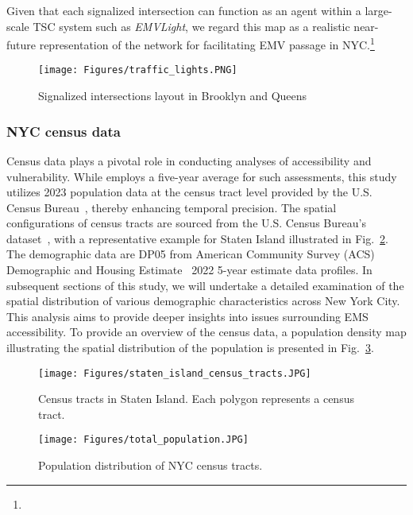 Given that each signalized intersection can function as an agent within a large-scale TSC system such as \textit{EMVLight}, we regard this map as a realistic near-future representation of the network for facilitating EMV passage in NYC.\footnote{}
\begin{figure}[h!]
    \centering
    \texttt{[image: Figures/traffic\_lights.PNG]}
    \caption{Signalized intersections layout in Brooklyn and Queens}
\label{fig:signalized_intersections}
\end{figure}

\subsubsection{NYC census data}
Census data plays a pivotal role in conducting analyses of accessibility and vulnerability. While  employs a five-year average for such assessments, this study utilizes 2023 population data at the census tract level provided by the U.S. Census Bureau~\cite{bureau2023census}, thereby enhancing temporal precision. The spatial configurations of census tracts are sourced from the U.S. Census Bureau's dataset~\cite{us_census_bureau_census_tracts_2023}, with a representative example for Staten Island illustrated in Fig.~\ref{fig:staten_island_census_tracts}. 
The demographic data are DP05 from American Community Survey (ACS) Demographic and Housing Estimate~\cite{acs2021demographic} 2022 5-year estimate data profiles. In subsequent sections of this study, we will undertake a detailed examination of the spatial distribution of various demographic characteristics across New York City. This analysis aims to provide deeper insights into issues surrounding EMS accessibility. To provide an overview of the census data, a population density map illustrating the spatial distribution of the population is presented in Fig.~\ref{fig:total_population}.
\begin{figure}[h!]
    \centering
    \texttt{[image: Figures/staten\_island\_census\_tracts.JPG]} 
    \caption{Census tracts in Staten Island. Each polygon represents a census tract.}
    \label{fig:staten_island_census_tracts}
\end{figure}
\begin{figure}[h!]
    \centering
    \texttt{[image: Figures/total\_population.JPG]} 
    \caption{Population distribution of NYC census tracts.}
    \label{fig:total_population}
\end{figure}

